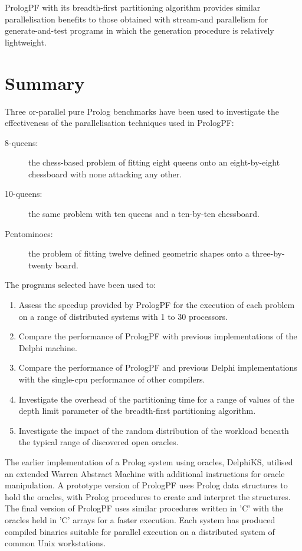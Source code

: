 PrologPF with its breadth-first partitioning algorithm provides similar parallelisation
benefits to those obtained with stream-and parallelism for
generate-and-test programs in which the
generation procedure is relatively lightweight.

\section{Summary} %

Three or-parallel pure Prolog benchmarks have been used to 
investigate the effectiveness of the parallelisation techniques used in PrologPF:
\begin{description}
\item[8-queens: ]{the chess-based problem of fitting eight queens onto an
  eight-by-eight chessboard with none attacking any other.}
\item[10-queens: ]{the same problem with ten queens and a ten-by-ten chessboard.}
\item[Pentominoes: ]{the problem of fitting twelve defined geometric shapes onto
  a three-by-twenty board.}
\end{description}
The programs selected have been used to:
\begin{enumerate}
\item{Assess the speedup provided by PrologPF for the execution of each problem on
  a range of distributed systems with 1 to 30 processors.}
\item{Compare the performance of PrologPF with previous implementations of the
  Delphi machine.}
\item{Compare the performance of PrologPF and previous Delphi implementations with
  the single-cpu performance of other compilers.}
\item{Investigate the overhead of the partitioning time for a range of values of
  the depth limit parameter of the breadth-first partitioning algorithm.}
\item{Investigate the impact of the random distribution of the workload beneath the
  typical range of discovered open oracles.}
\end{enumerate}

The earlier implementation of a Prolog system using oracles, DelphiKS, utilised
an extended Warren Abstract Machine \cite{War83} with additional instructions for
oracle manipulation.  A prototype version of PrologPF uses Prolog data structures
to hold the oracles, with Prolog procedures to create and interpret the
structures.  The final version of PrologPF uses similar procedures written in 'C'
with the oracles held in 'C' arrays for a faster execution.  Each system has produced
compiled binaries suitable for parallel execution on a distributed system of common Unix
workstations.

